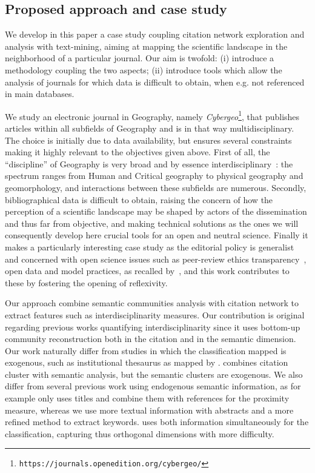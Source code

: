 \subsection*{Proposed approach and case study}

We develop in this paper a case study coupling citation network exploration and analysis with text-mining, aiming at mapping the scientific landscape in the neighborhood of a particular journal. Our aim is twofold: (i) introduce a methodology coupling the two aspects; (ii) introduce tools which allow the analysis of journals for which data is difficult to obtain, when e.g. not referenced in main databases.

We study an electronic journal in Geography, namely \textit{Cybergeo}\footnote{\texttt{https://journals.openedition.org/cybergeo/}}, that publishes articles within all subfields of Geography and is in that way multidisciplinary. The choice is initially due to data availability, but ensures several constraints making it highly relevant to the objectives given above. First of all, the ``discipline'' of Geography is very broad and by essence interdisciplinary~\citep{bracken2016interdisciplinarity}: the spectrum ranges from Human and Critical geography to physical geography and geomorphology, and interactions between these subfields are numerous. Secondly, bibliographical data is difficult to obtain, raising the concern of how the perception of a scientific landscape may be shaped by actors of the dissemination and thus far from objective, and making technical solutions as the ones we will consequently develop here crucial tools for an open and neutral science. Finally it makes a particularly interesting case study as the editorial policy is generalist and concerned with open science issues such as peer-review ethics transparency~\citep{10.1371/journal.pone.0147913}, open data and model practices, as recalled by~\cite{pumain2015adapting}, and this work contributes to these by fostering the opening of reflexivity.


Our approach combine semantic communities analysis with citation network to extract features such as interdisciplinarity measures. Our contribution is original regarding previous works quantifying interdisciplinarity since it uses bottom-up community reconstruction both in the citation and in the semantic dimension. Our work naturally differ from studies in which the classification mapped is exogenous, such as institutional thesaurus as mapped by \cite{boyack2017thesaurus}. \cite{zhang2010journal} combines citation cluster with semantic analysis, but the semantic clusters are exogenous. We also differ from several previous work using endogenous semantic information, as \cite{vugteveen2014dynamics} for example only uses titles and combine them with references for the proximity measure, whereas we use more textual information with abstracts and a more refined method to extract keywords. \cite{bouveyron2016stochastic} uses both information simultaneously for the classification, capturing thus orthogonal dimensions with more difficulty.



